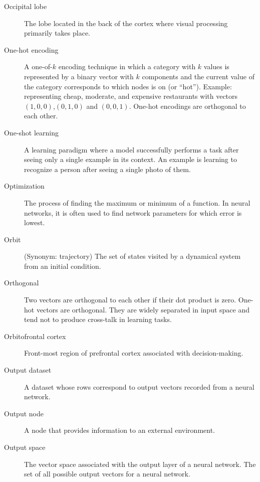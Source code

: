 \begin{description}
\item[Occipital lobe] The lobe located in the back of the cortex where visual processing primarily takes place. 

\item[One-hot encoding] A one-of-$k$ encoding technique in which  a category with $k$ values is represented by a binary vector with $k$ components and the current value of the category corresponds to which nodes is on (or ``hot''). Example: representing cheap, moderate, and expensive restaurants with vectors $(1,0,0)$,$(0,1,0)$ and $(0,0,1)$. One-hot encodings are orthogonal to each other.

\item[One-shot learning] A learning paradigm where a model successfully performs a task after seeing only a single example in its context. An example is learning to recognize a person after seeing a single photo of them.

\item[Optimization] The process of finding the maximum or minimum of a function. In neural networks, it is often used to find network parameters for which error is lowest.

\item[Orbit] (Synonym: trajectory) The set of states visited by a dynamical system from an initial condition. 

\item[Orthogonal] Two vectors are orthogonal to each other if their dot product is zero. One-hot vectors are orthogonal. They are widely separated in input space and tend not to produce cross-talk in learning tasks.

\item[Orbitofrontal cortex] Front-most region of prefrontal cortex associated with decision-making.

\item[Output dataset] A dataset whose rows correspond to output vectors recorded from a neural network. 

\item[Output node] A node that provides information to an external environment.  

\item[Output space] The vector space associated with the output layer of a neural network. The set of all possible output vectors for a neural network.


\end{description}
